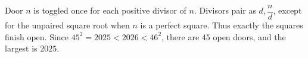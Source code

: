 Door $n$ is toggled once for each positive divisor of $n$. Divisors pair as $d , \dfrac{n}{d}$, except for the unpaired square root when $n$ is a perfect square. Thus exactly the squares finish open. Since $45^2=2025<2026<46^2$, there are $\boxed{45}$ open doors, and the largest is $\boxed{2025}$.
